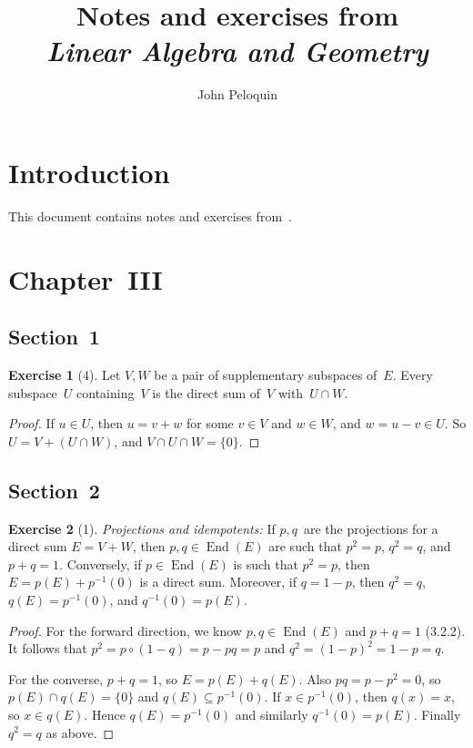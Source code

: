 \documentclass[letterpaper,12pt]{article}
\title{Notes and exercises from\\\textit{Linear Algebra and Geometry}}
\author{John Peloquin}
\date{}
\newcommand{\sect}{\cap}
\newcommand{\after}{\circ}
\DeclareMathOperator{\End}{End}
\newcommand{\inv}[1]{#1^{-1}}
\newcommand{\kerz}[1]{\inv{#1}(0)}
\theoremstyle{definition}
\newtheorem*{exer}{Exercise}
\theoremstyle{remark}
\begin{document}
\maketitle

\section*{Introduction}
This document contains notes and exercises from~\cite{dieudonne}.

\section*{Chapter~III}
\subsection*{Section~1}
\begin{exer}[4]
Let \(V,W\) be a pair of supplementary subspaces of~\(E\). Every subspace~\(U\) containing~\(V\) is the direct sum of~\(V\) with~\(U\sect W\).
\end{exer}
\begin{proof}
If \(u\in U\), then \(u=v+w\) for some \(v\in V\) and \(w\in W\), and \(w=u-v\in U\). So \(U=V+(U\sect W)\), and \(V\sect U\sect W=\{0\}\).
\end{proof}

\subsection*{Section~2}
\begin{exer}[1]
\emph{Projections and idempotents:} If \(p,q\)~are the projections for a direct sum \(E=V+W\), then \(p,q\in\End(E)\) are such that \(p^2=p\), \(q^2=q\), and \(p+q=1\). Conversely, if \(p\in\End(E)\) is such that \(p^2=p\), then \(E=p(E)+\kerz{p}\) is a direct sum. Moreover, if \(q=1-p\), then \(q^2=q\), \(q(E)=\kerz{p}\), and \(\kerz{q}=p(E)\).
\end{exer}
\begin{proof}
For the forward direction, we know \(p,q\in\End(E)\) and \(p+q=1\) (3.2.2). It follows that \(p^2=p\after(1-q)=p-pq=p\) and \(q^2=(1-p)^2=1-p=q\).

For the converse, \(p+q=1\), so \(E=p(E)+q(E)\). Also \(pq=p-p^2=0\), so \(p(E)\sect q(E)=\{0\}\) and \(q(E)\subseteq\kerz{p}\). If \(x\in\kerz{p}\), then \(q(x)=x\), so \(x\in q(E)\). Hence \(q(E)=\kerz{p}\) and similarly \(\kerz{q}=p(E)\). Finally \(q^2=q\) as above.
\end{proof}
\end{document}
